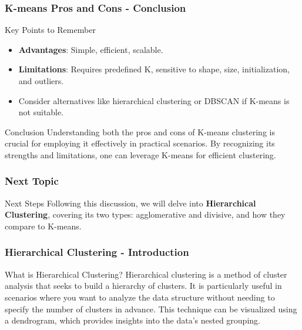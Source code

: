 \documentclass[aspectratio=169]{beamer}
\begin{document}
\begin{frame}[fragile]
    \frametitle{K-means Pros and Cons - Conclusion}
    \begin{block}{Key Points to Remember}
        \begin{itemize}
            \item \textbf{Advantages}: Simple, efficient, scalable.
            \item \textbf{Limitations}: Requires predefined K, sensitive to shape, size, initialization, and outliers.
            \item Consider alternatives like hierarchical clustering or DBSCAN if K-means is not suitable.
        \end{itemize}
    \end{block}
    \begin{block}{Conclusion}
        Understanding both the pros and cons of K-means clustering is crucial for employing it effectively in practical scenarios.
        By recognizing its strengths and limitations, one can leverage K-means for efficient clustering.
    \end{block}
\end{frame}

\begin{frame}[fragile]
    \frametitle{Next Topic}
    \begin{block}{Next Steps}
        Following this discussion, we will delve into \textbf{Hierarchical Clustering}, covering its two types: agglomerative and divisive, and how they compare to K-means.
    \end{block}
\end{frame}

\begin{frame}[fragile]
    \frametitle{Hierarchical Clustering - Introduction}
    \begin{block}{What is Hierarchical Clustering?}
        Hierarchical clustering is a method of cluster analysis that seeks to build a hierarchy of clusters. 
        It is particularly useful in scenarios where you want to analyze the data structure without needing to specify the number of clusters in advance. 
        This technique can be visualized using a dendrogram, which provides insights into the data's nested grouping.
    \end{block}
\end{frame}
\end{document}
